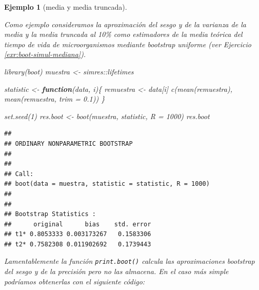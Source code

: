\documentclass[
]{book}
\newenvironment{Shaded}{\begin{snugshade}}{\end{snugshade}}
\newcommand{\AttributeTok}[1]{\textcolor[rgb]{0.77,0.63,0.00}{#1}}
\newcommand{\ControlFlowTok}[1]{\textcolor[rgb]{0.13,0.29,0.53}{\textbf{#1}}}
\newcommand{\DecValTok}[1]{\textcolor[rgb]{0.00,0.00,0.81}{#1}}
\newcommand{\FloatTok}[1]{\textcolor[rgb]{0.00,0.00,0.81}{#1}}
\newcommand{\FunctionTok}[1]{\textcolor[rgb]{0.00,0.00,0.00}{#1}}
\newcommand{\NormalTok}[1]{#1}
\newcommand{\OtherTok}[1]{\textcolor[rgb]{0.56,0.35,0.01}{#1}}
\newcommand{\SpecialCharTok}[1]{\textcolor[rgb]{0.00,0.00,0.00}{#1}}
\theoremstyle{break}
\newtheorem{example}{Ejemplo}[chapter]
\theoremstyle{nonumberplain}
\begin{document}
\begin{example}[media y media truncada]
\protect\hypertarget{exm:boot-simul-sesgo-var}{}\label{exm:boot-simul-sesgo-var}

Como ejemplo consideramos la aproximación del sesgo y de la varianza de la media y la media truncada al 10\% como estimadores de la media teórica del tiempo de vida de microorganismos mediante bootstrap uniforme (ver Ejercicio \ref{exr:boot-simul-mediana}).

\begin{Shaded}
\begin{Highlighting}[]
\FunctionTok{library}\NormalTok{(boot)}
\NormalTok{muestra }\OtherTok{\textless{}{-}}\NormalTok{ simres}\SpecialCharTok{::}\NormalTok{lifetimes}

\NormalTok{statistic }\OtherTok{\textless{}{-}} \ControlFlowTok{function}\NormalTok{(data, i)\{}
\NormalTok{  remuestra }\OtherTok{\textless{}{-}}\NormalTok{ data[i]}
  \FunctionTok{c}\NormalTok{(}\FunctionTok{mean}\NormalTok{(remuestra), }\FunctionTok{mean}\NormalTok{(remuestra, }\AttributeTok{trim =} \FloatTok{0.1}\NormalTok{))}
\NormalTok{\}}

\FunctionTok{set.seed}\NormalTok{(}\DecValTok{1}\NormalTok{)}
\NormalTok{res.boot }\OtherTok{\textless{}{-}} \FunctionTok{boot}\NormalTok{(muestra, statistic, }\AttributeTok{R =} \DecValTok{1000}\NormalTok{)}
\NormalTok{res.boot}
\end{Highlighting}
\end{Shaded}

\begin{verbatim}
## 
## ORDINARY NONPARAMETRIC BOOTSTRAP
## 
## 
## Call:
## boot(data = muestra, statistic = statistic, R = 1000)
## 
## 
## Bootstrap Statistics :
##      original      bias    std. error
## t1* 0.8053333 0.003173267   0.1583306
## t2* 0.7582308 0.011902692   0.1739443
\end{verbatim}

Lamentablemente la función \texttt{print.boot()} calcula las aproximaciones bootstrap del sesgo y de la precisión pero no las almacena.
En el caso más simple podríamos obtenerlas con el siguiente código:


\end{example}
\end{document}
